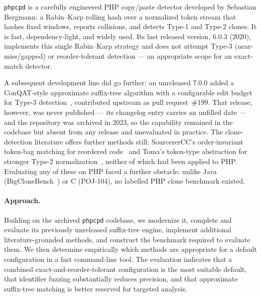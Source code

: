 \documentclass[10pt,a4paper]{article}
\newcounter{prop}[section]
\newcounter{lem}[section]
\begin{document}
\texttt{phpcpd} is a carefully engineered PHP copy/paste detector developed by Sebastian Bergmann: a
Rabin--Karp rolling hash over a normalized token stream that hashes fixed windows, reports collisions,
and detects Type-1 and Type-2 clones. It is fast, dependency-light, and widely used. Its last released
version, 6.0.3 (2020), implements this single Rabin--Karp strategy and does not attempt Type-3
(near-miss/gapped) or reorder-tolerant detection --- an appropriate scope for an exact-match detector.

A subsequent development line did go further: an unreleased 7.0.0 added a ConQAT-style approximate
suffix-tree algorithm with a configurable edit budget for Type-3 detection~\cite{conqat}, contributed
upstream as pull request~\#199. That release, however, was never published --- its changelog entry
carries an unfilled date --- and the repository was archived in 2023, so the capability remained in the
codebase but absent from any release and unevaluated in practice. The clone-detection literature offers
further methods still: SourcererCC's order-invariant token-bag matching for reordered
code~\cite{sourcerercc} and Toma's token-type abstraction for stronger Type-2
normalization~\cite{toma}, neither of which had been applied to PHP. Evaluating any of these on PHP
faced a further obstacle: unlike Java (BigCloneBench~\cite{bigclonebench}) or C (POJ-104), no labelled
PHP clone benchmark existed.

\paragraph{Approach.} Building on the archived \texttt{phpcpd} codebase, we modernize it, complete and
evaluate its previously unreleased suffix-tree engine, implement additional literature-grounded
methods, and construct the benchmark required to evaluate them. We then determine empirically which
methods are appropriate for a default configuration in a fast command-line tool. The evaluation
indicates that a combined exact-and-reorder-tolerant configuration is the most suitable default, that
identifier fuzzing substantially reduces precision, and that approximate suffix-tree matching is better
reserved for targeted analysis.
\end{document}
